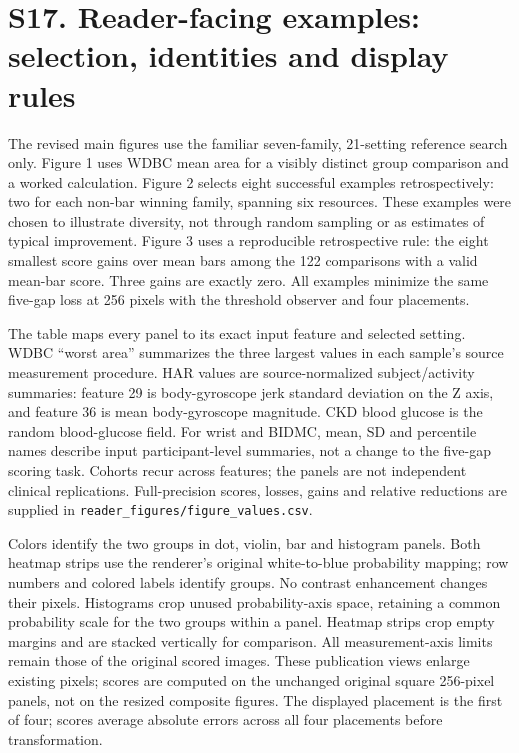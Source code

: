 \documentclass[10pt]{article}
\begin{document}
\clearpage
\section*{S17. Reader-facing examples: selection, identities and display rules}
The revised main figures use the familiar seven-family, 21-setting reference search only. Figure 1 uses WDBC mean area for a visibly distinct group comparison and a worked calculation. Figure 2 selects eight successful examples retrospectively: two for each non-bar winning family, spanning six resources. These examples were chosen to illustrate diversity, not through random sampling or as estimates of typical improvement. Figure 3 uses a reproducible retrospective rule: the eight smallest score gains over mean bars among the 122 comparisons with a valid mean-bar score. Three gains are exactly zero. All examples minimize the same five-gap loss at 256 pixels with the threshold observer and four placements.

The table maps every panel to its exact input feature and selected setting. WDBC ``worst area'' summarizes the three largest values in each sample's source measurement procedure. HAR values are source-normalized subject/activity summaries: feature 29 is body-gyroscope jerk standard deviation on the Z axis, and feature 36 is mean body-gyroscope magnitude. CKD blood glucose is the random blood-glucose field. For wrist and BIDMC, mean, SD and percentile names describe input participant-level summaries, not a change to the five-gap scoring task. Cohorts recur across features; the panels are not independent clinical replications. Full-precision scores, losses, gains and relative reductions are supplied in \texttt{reader\_figures/figure\_values.csv}.



Colors identify the two groups in dot, violin, bar and histogram panels. Both heatmap strips use the renderer's original white-to-blue probability mapping; row numbers and colored labels identify groups. No contrast enhancement changes their pixels. Histograms crop unused probability-axis space, retaining a common probability scale for the two groups within a panel. Heatmap strips crop empty margins and are stacked vertically for comparison. All measurement-axis limits remain those of the original scored images. These publication views enlarge existing pixels; scores are computed on the unchanged original square 256-pixel panels, not on the resized composite figures. The displayed placement is the first of four; scores average absolute errors across all four placements before transformation.
\end{document}
